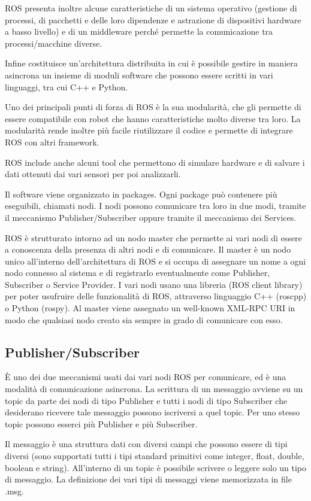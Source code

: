 \documentclass[Lau, binding=0.6cm, oneside]{sapthesis}
\begin{document}
ROS presenta inoltre alcune caratteristiche di un sistema operativo (gestione di processi, di pacchetti e delle loro dipendenze e astrazione di dispositivi hardware a basso livello) e di un middleware perché permette la comunicazione tra processi/macchine diverse.

Infine costituisce un’architettura distribuita in cui è possibile gestire in maniera asincrona un insieme di moduli software che possono essere scritti in vari linguaggi, tra cui C++ e Python.

Uno dei principali punti di forza di ROS è la sua modularità, che gli permette di essere compatibile con robot che hanno caratteristiche molto diverse tra loro.
La modularità rende inoltre più facile riutilizzare il codice e permette di integrare ROS con altri framework.

ROS include anche alcuni tool che permettono di simulare hardware e di salvare i dati ottenuti dai vari sensori per poi analizzarli.

Il software viene organizzato in packages. Ogni package può contenere più eseguibili, chiamati nodi.
I nodi possono comunicare tra loro in due modi, tramite il meccanismo Publisher/Subscriber oppure tramite il meccanismo dei Services.

ROS è strutturato intorno ad un nodo master che permette ai vari nodi di essere a conoscenza della presenza di altri nodi e di comunicare.
Il master è un nodo unico all’interno dell’architettura di ROS e si occupa di assegnare un nome a ogni nodo connesso al sistema e di registrarlo eventualmente come Publisher, Subscriber o Service Provider.
I vari nodi usano una libreria (ROS client library) per poter usufruire delle funzionalità di ROS, attraverso linguaggio C++ (roscpp) o Python (rospy).
Al master viene assegnato un well-known XML-RPC URI in modo che qualsiasi nodo creato sia sempre in grado di comunicare con esso\cite{fonte3}.

\subsection{Publisher/Subscriber}
È uno dei due meccanismi usati dai vari nodi ROS per comunicare, ed è una modalità di comunicazione asincrona.
La scrittura di un messaggio avviene su un topic da parte dei nodi di tipo Publisher e tutti i nodi di tipo Subscriber che desiderano ricevere tale messaggio possono iscriversi a quel topic.
Per uno stesso topic possono esserci più Publisher e più Subscriber.

Il messaggio è una struttura dati con diversi campi che possono essere di tipi diversi (sono supportati tutti i tipi standard primitivi come integer, float, double, boolean e string).
All’interno di un topic è possibile scrivere o leggere solo un tipo di messaggio.
La definizione dei vari tipi di messaggi viene memorizzata in file .msg.
\end{document}
